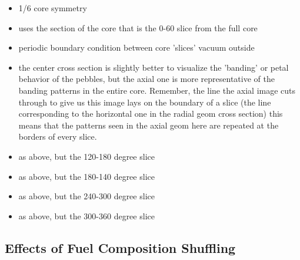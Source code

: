 
\begin{itemize}
\item 1/6 core symmetry
\item uses the section of the core that is the 0-60 slice from the full core
\item periodic boundary condition between core 'slices' vacuum outside
\item the center cross section is slightly better to visualize the 'banding' or petal behavior of the pebbles, but the axial one is more representative of the banding patterns in the entire core.  Remember, the line the axial image cuts through to give us this image lays on the boundary of a slice (the line corresponding to the horizontal one in the radial geom cross section) this means that the patterns seen in the axial geom here are repeated at the borders of every slice.
\end{itemize}


\begin{itemize}
\item as above, but the 120-180 degree slice
\end{itemize}


\begin{itemize}
\item as above, but the 180-140 degree slice
\end{itemize}


\begin{itemize}
\item as above, but the 240-300 degree slice
\end{itemize}


\begin{itemize}
\item as above, but the 300-360 degree slice
\end{itemize}

\subsection{Effects of Fuel Composition Shuffling}